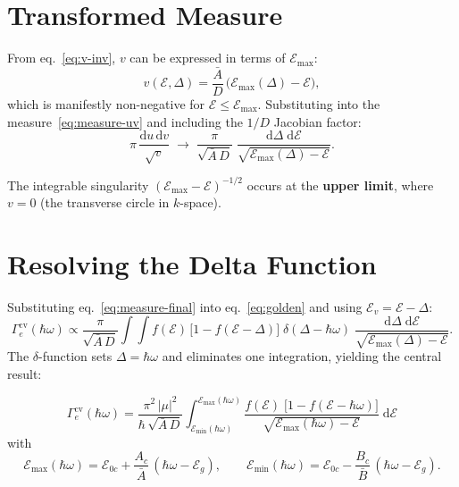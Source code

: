 \documentclass[11pt,a4paper]{article}
\newcommand{\E}{\mathcal{E}}              %
\newcommand{\Ev}{\E_v}
\newcommand{\Eoc}{\E_{0c}}
\newcommand{\Eg}{\E_g}
\newcommand{\Emax}{\E_{\max}}
\newcommand{\Emin}{\E_{\min}}
\newcommand{\Abar}{\bar{A}}
\newcommand{\Bbar}{\bar{B}}
\newcommand{\hw}{\hbar\omega}
\newcommand{\dd}{\mathrm{d}}
\begin{document}
\section{Transformed Measure}

From eq.~\eqref{eq:v-inv}, $v$ can be expressed in terms of $\Emax$:
\begin{equation}\label{eq:v-Emax}
  v(\E, \Delta) = \frac{\Abar}{D}\,\bigl(\Emax(\Delta) - \E\bigr),
\end{equation}
which is manifestly non-negative for $\E \leq \Emax$. Substituting into the measure~\eqref{eq:measure-uv} and including the $1/D$ Jacobian factor:
\begin{equation}\label{eq:measure-final}
  \pi\,\frac{\dd u\,\dd v}{\sqrt{v}}
  \;\longrightarrow\;
  \frac{\pi}{\sqrt{\Abar\,D}}\;
  \frac{\dd\Delta\;\dd\E}{\sqrt{\Emax(\Delta) - \E}}.
\end{equation}

The integrable singularity $(\Emax - \E)^{-1/2}$ occurs at the \textbf{upper limit}, where $v=0$ (the transverse circle in $k$-space).

\section{Resolving the Delta Function}

Substituting eq.~\eqref{eq:measure-final} into eq.~\eqref{eq:golden} and using $\Ev = \E - \Delta$:
\begin{equation}
  \Gamma_e^{\mathrm{cv}}(\hw)
  \propto
  \frac{\pi}{\sqrt{\Abar\,D}}
  \int\!\!\int
  f(\E)\,\bigl[1-f(\E-\Delta)\bigr]\;
  \delta(\Delta - \hw)\;
  \frac{\dd\Delta\;\dd\E}{\sqrt{\Emax(\Delta) - \E}}.
\end{equation}
The $\delta$-function sets $\Delta = \hw$ and eliminates one integration, yielding the central result:

\begin{equation}\label{eq:result}
  \boxed{\;
    \Gamma_e^{\mathrm{cv}}(\hw)
    = \frac{\pi^2\,|\mu|^2}{\hbar\,\sqrt{\Abar\,D}}
    \int_{\Emin(\hw)}^{\Emax(\hw)}
    \frac{f(\E)\;\bigl[1 - f(\E - \hw)\bigr]}
         {\sqrt{\Emax(\hw) - \E}}
    \;\dd\E
  \;}
\end{equation}
with
\begin{equation}\label{eq:limits-final}
  \Emax(\hw) = \Eoc + \frac{A_c}{\Abar}\,(\hw - \Eg),
  \qquad
  \Emin(\hw) = \Eoc - \frac{B_c}{\Bbar}\,(\hw - \Eg).
\end{equation}
\end{document}

